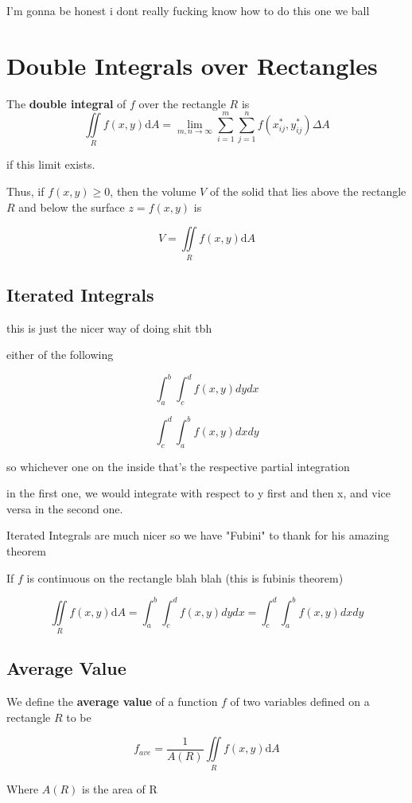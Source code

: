 \documentclass{article}
\begin{document}
I'm gonna be honest i dont really fucking know how to do this one we ball

\newpage
\section{Double Integrals over Rectangles}

The \textbf{double integral} of $f$ over the rectangle $R$ is
$$\iint\limits_{R}f(x,y)\mathrm{d}A = \lim_{m,n \rightarrow \infty}\sum_{i=1}^{m}\sum_{j=1}^{n}f(x_{ij}^*, y_{ij}^*)\Delta A$$

if this limit exists.

Thus, if $f(x,y) \geq 0$, then the volume $V$ of the solid that lies above the rectangle $R$ and below the surface $z = f(x,y)$ is 

$$V = \iint\limits_{R}f(x,y)\mathrm{d}A$$

\subsection{Iterated Integrals}

this is just the nicer way of doing shit tbh

either of the following

$$\int^b_a\int^d_cf(x,y)dy dx$$

$$\int^d_c\int^b_af(x,y)dxdy$$

so whichever one on the inside that's the respective partial integration

in the first one, we would integrate with respect to y first and then x, and vice versa in the second one.

Iterated Integrals are much nicer so we have "Fubini" to thank for his amazing theorem 

If $f$ is continuous on the rectangle blah blah (this is fubinis theorem)

$$\iint\limits_{R}f(x,y)\mathrm{d}A = \int^b_a\int^d_cf(x,y)dy dx  = \int^d_c\int^b_af(x,y)dxdy$$


\subsection{Average Value}

 We define the \textbf{average value} of a function $f$ of two variables defined on a rectangle $R$ to be

$$f_{ave} = \frac{1}{A(R)}\iint\limits_{R}f(x,y)\mathrm{d}A$$

Where $A(R)$ is the area of R
\end{document}
